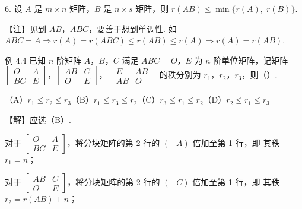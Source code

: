 6. 设 $A$ 是 $m\times n$ 矩阵，$B$ 是 $n\times s$ 矩阵，则 $r(AB)\le\min\{r(A),\;r(B)\}$.

\begin{fnote}
【注】见到 $AB$，$ABC$，要善于想到单调性.
如 $ABC=A\Rightarrow r(A)=r(ABC)\le r(AB)\le r(A)\Rightarrow r(A)=r(AB)$.
\end{fnote}

\begin{fcard}{例 4.4}
已知 $n$ 阶矩阵 $A$，$B$，$C$ 满足 $ABC=O$，$E$ 为 $n$ 阶单位矩阵，记矩阵 $\begin{bmatrix}O&A\\BC&E\end{bmatrix}$，$\begin{bmatrix}AB&C\\O&E\end{bmatrix}$，$\begin{bmatrix}E&AB\\AB&O\end{bmatrix}$ 的秩分别为 $r_1$，$r_2$，$r_3$，则（\quad）.
\end{fcard}


（A）$r_1\le r_2\le r_3$\qquad（B）$r_1\le r_3\le r_2$\qquad（C）$r_3\le r_1\le r_2$\qquad（D）$r_2\le r_1\le r_3$

【解】应选（B）.

对于 $\begin{bmatrix}O&A\\BC&E\end{bmatrix}$，将分块矩阵的第 2 行的 $(-A)$ 倍加至第 1 行，即
其秩 $r_1=n$；

对于 $\begin{bmatrix}AB&C\\O&E\end{bmatrix}$，将分块矩阵的第 2 行的 $(-C)$ 倍加至第 1 行，即
其秩 $r_2=r(AB)+n$；

